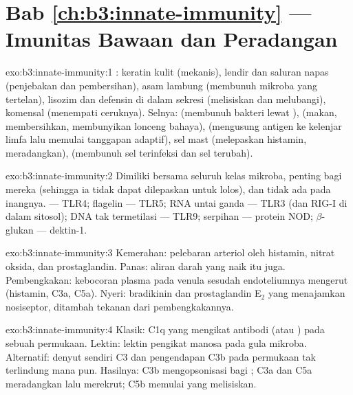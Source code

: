 \section*{Bab \ref{ch:b3:innate-immunity} --- Imunitas Bawaan dan Peradangan}

\begin{solution}{exo:b3:innate-immunity:1}
: keratin kulit (mekanis), lendir dan  saluran napas (penjebakan
dan pembersihan), asam lambung (membunuh mikroba yang tertelan), lisozim dan
defensin di dalam sekresi (melisiskan dan melubangi),  komensal
(menempati ceruknya). Selnya:  (membunuh bakteri lewat ),
 (makan, membersihkan, membunyikan lonceng bahaya),  (mengusung
antigen ke kelenjar limfa lalu memulai tanggapan adaptif), sel mast
(melepaskan histamin, meradangkan),  (membunuh sel terinfeksi dan
sel terubah).
\end{solution}

\begin{solution}{exo:b3:innate-immunity:2}
Dimiliki bersama seluruh kelas mikroba, penting bagi mereka (sehingga ia tidak dapat
dilepaskan untuk lolos), dan tidak ada pada inangnya.  ---
TLR4; flagelin --- TLR5; RNA untai ganda --- TLR3 (dan RIG-I di dalam
sitosol); DNA  tak termetilasi --- TLR9; serpihan  --- protein
NOD; $\beta$-glukan --- dektin-1.
\end{solution}

\begin{solution}{exo:b3:innate-immunity:3}
Kemerahan: pelebaran arteriol oleh histamin, nitrat oksida, dan
prostaglandin. Panas: aliran darah yang naik itu juga. Pembengkakan: kebocoran
plasma pada venula sesudah endoteliumnya mengerut (histamin, C3a, C5a).
Nyeri: bradikinin dan prostaglandin E$_{2}$ yang menajamkan nosiseptor,
ditambah tekanan dari pembengkakannya.
\end{solution}

\begin{solution}{exo:b3:innate-immunity:4}
Klasik: C1q yang mengikat antibodi (atau ) pada sebuah permukaan.
Lektin: lektin pengikat manosa pada gula mikroba. Alternatif:
denyut sendiri C3 dan pengendapan C3b pada permukaan tak terlindung mana pun.
Hasilnya: C3b mengopsonisasi bagi ; C3a dan C5a meradangkan lalu
merekrut; C5b memulai  yang melisiskan.
\end{solution}

